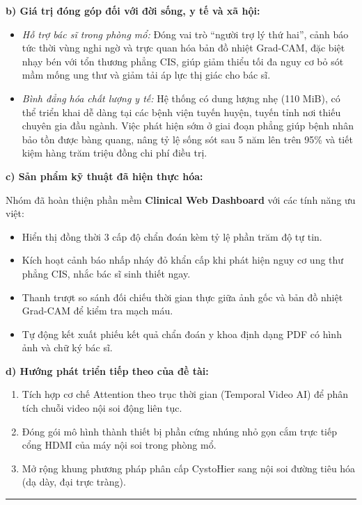 \documentclass[a4paper]{article}
\begin{document}
\noindent\textbf{b) Giá trị đóng góp đối với đời sống, y tế và xã hội:}
\begin{itemize}
  \item \textit{Hỗ trợ bác sĩ trong phòng mổ:} Đóng vai trò ``người trợ lý thứ hai'', cảnh báo tức thời vùng nghi ngờ và trực quan hóa bản đồ nhiệt Grad-CAM, đặc biệt nhạy bén với tổn thương phẳng CIS, giúp giảm thiểu tối đa nguy cơ bỏ sót mầm mống ung thư và giảm tải áp lực thị giác cho bác sĩ.
  \item \textit{Bình đẳng hóa chất lượng y tế:} Hệ thống có dung lượng nhẹ (110 MiB), có thể triển khai dễ dàng tại các bệnh viện tuyến huyện, tuyến tỉnh nơi thiếu chuyên gia đầu ngành. Việc phát hiện sớm ở giai đoạn phẳng giúp bệnh nhân bảo tồn được bàng quang, nâng tỷ lệ sống sót sau 5 năm lên trên 95\% và tiết kiệm hàng trăm triệu đồng chi phí điều trị.
\end{itemize}

\noindent\textbf{c) Sản phẩm kỹ thuật đã hiện thực hóa:}

Nhóm đã hoàn thiện phần mềm \textbf{Clinical Web Dashboard} với các tính năng ưu việt:
\begin{itemize}
  \item Hiển thị đồng thời 3 cấp độ chẩn đoán kèm tỷ lệ phần trăm độ tự tin.
  \item Kích hoạt cảnh báo nhấp nháy đỏ khẩn cấp khi phát hiện nguy cơ ung thư phẳng CIS, nhắc bác sĩ sinh thiết ngay.
  \item Thanh trượt so sánh đối chiếu thời gian thực giữa ảnh gốc và bản đồ nhiệt Grad-CAM để kiểm tra mạch máu.
  \item Tự động kết xuất phiếu kết quả chẩn đoán y khoa định dạng PDF có hình ảnh và chữ ký bác sĩ.
\end{itemize}

\noindent\textbf{d) Hướng phát triển tiếp theo của đề tài:}
\begin{enumerate}
  \item Tích hợp cơ chế Attention theo trục thời gian (Temporal Video AI) để phân tích chuỗi video nội soi động liên tục.
  \item Đóng gói mô hình thành thiết bị phần cứng nhúng nhỏ gọn cắm trực tiếp cổng HDMI của máy nội soi trong phòng mổ.
  \item Mở rộng khung phương pháp phân cấp CystoHier sang nội soi đường tiêu hóa (dạ dày, đại trực tràng).
\end{enumerate}

\vspace{12pt}
\hrule
\vspace{8pt}
\end{document}
